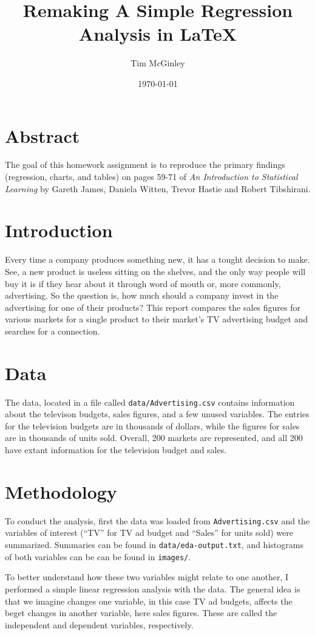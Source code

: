 \documentclass{article}
\title{Remaking A Simple Regression Analysis in LaTeX}
\author{Tim McGinley}
\begin{document}

\date{\today}
\maketitle


\section{Abstract}
The goal of this homework assignment is to reproduce the primary findings (regression, charts, and tables) on pages 59-71 of \emph{An Introduction to Statistical Learning} by Gareth James, Daniela Witten, Trevor Hastie and Robert Tibshirani.


\section{Introduction}
Every time a company produces something new, it has a tought decision to make.  See, a new product is useless sitting on the shelves, and the only way people will buy it is if they hear about it through word of mouth or, more commonly, advertising.  So the question is, how much should a company invest in the advertising for one of their products? This report compares the sales figures for various markets for a single product to their market's TV advertising budget and searches for a connection. 

\section{Data}
The data, located in a file called \texttt{data/Advertising.csv} contains information about the televison budgets, sales figures, and a few unused variables.  The entries for the television budgets are in thousands of dollars, while the figures for sales are in thousands of units sold. Overall, 200 markets are represented, and all 200 have extant information for the television budget and sales. 

\section{Methodology}
To conduct the analysis, first the data was loaded from \texttt{Advertising.csv} and the variables of interest (``TV'' for TV ad budget and ``Sales'' for units sold) were summarized. Summaries can be found in 
\texttt{data/eda-output.txt}, and histograms of both variables can be can be found in \texttt{images/}.  

To better understand how these two variables might relate to one another, I performed a simple linear regression analysis with the data.  The general idea is that we imagine changes one variable, in this case TV ad budgets, affects the beget changes in another variable, here sales figures. These are called the independent and dependent variables, respectively.  
\end{document}
